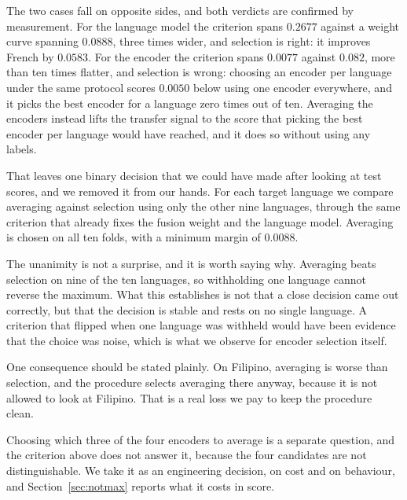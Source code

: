 The two cases fall on opposite sides, and both verdicts are confirmed by
measurement. For the language model the criterion spans $0.2677$ against
a weight curve spanning $0.0888$, three times wider, and selection is
right: it improves French by $0.0583$. For the encoder the criterion
spans $0.0077$ against $0.082$, more than ten times flatter, and
selection is wrong: choosing an encoder per language under the same
protocol scores $0.0050$ below using one encoder everywhere, and it
picks the best encoder for a language zero times out of ten. Averaging the encoders instead lifts the transfer signal to the score
that picking the best encoder per language would have reached, and it
does so without using any labels.

That leaves one binary decision that we could have made after looking at
test scores, and we removed it from our hands. For each target language
we compare averaging against selection using only the other nine
languages, through the same criterion that already fixes the fusion
weight and the language model. Averaging is chosen on all ten folds,
with a minimum margin of $0.0088$.

The unanimity is not a surprise, and it is worth saying why. Averaging
beats selection on nine of the ten languages, so withholding one
language cannot reverse the maximum. What this establishes is not that a
close decision came out correctly, but that the decision is stable and
rests on no single language. A criterion that flipped when one language
was withheld would have been evidence that the choice was noise, which
is what we observe for encoder selection itself.

One consequence should be stated plainly. On Filipino, averaging is
worse than selection, and the procedure selects averaging there anyway,
because it is not allowed to look at Filipino. That is a real loss we
pay to keep the procedure clean.

Choosing which three of the four encoders to average is a separate
question, and the criterion above does not answer it, because the four
candidates are not distinguishable. We take it as an engineering
decision, on cost and on behaviour, and Section~\ref{sec:notmax} reports
what it costs in score.


